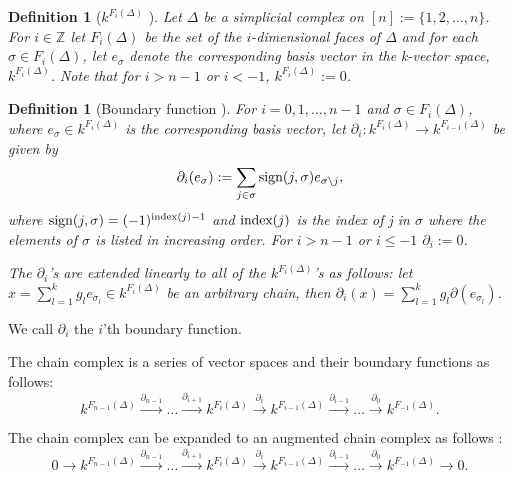 \documentclass[11pt,a4paper,twoside]{report}
\newtheorem{mydef}[mythm]{Definition}
\begin{document}
\begin{mydef}[$k^{F_i(\Delta)}$ \cite{Allgaier}]
Let $\Delta$ be a simplicial complex on $[n] := \{1,2,\dots ,n\}$. For $i\in \mathbb{Z}$ let $F_i(\Delta)$ be the set of the $i$-dimensional faces of $\Delta$ and for each $\sigma\in F_i(\Delta)$, let $e_{\sigma}$ denote the corresponding basis vector in the k-vector space, $k^{F_i(\Delta)}$. Note that for $i>n-1$ or $i<-1$, $k^{F_i(\Delta)}:=0$.
\end{mydef}

\begin{mydef}[Boundary function \cite{Allgaier}]\label{def:boundary}
For $i=0,1,\dots,n-1$ and $\sigma\in F_i(\Delta)$, where $e_\sigma\in k^{F_i(\Delta)}$ is the corresponding basis vector, let $\partial_i: k^{F_i(\Delta)} \to k^{F_{i-1}(\Delta)}$ be given by 
\begin{equation*}
\partial_i(e_\sigma):=\sum_{j\in\sigma}\textnormal{sign}(j,\sigma)e_{\sigma\setminus j} ,
\end{equation*}
where $\textnormal{sign}(j,\sigma) = (-1)^{\textnormal{index}(j)-1}$ and $\textnormal{index}(j)$ is the index of j in $\sigma$ where the elements of $\sigma$ is listed in increasing order. For $i>n-1$ or $i\leq-1$ $\partial_i:=0$. 

The $\partial_i$'s are extended linearly to all of the $k^{F_i(\Delta)}$'s as follows: let $x = \sum_{l=1}^kg_le_{\sigma_l}\in k^{F_i(\Delta)}$ be an arbitrary chain, then $\partial_i(x)=\sum_{l=1}^kg_l\partial (e_{\sigma_l})$.
\end{mydef}
We call $\partial_i$ the $i$'th boundary function.

The chain complex is a series of vector spaces and their boundary functions as follows:
\begin{equation*}
k^{F_{n-1}(\Delta)}\overset{\partial_{n-1}}{\to}\dots\overset{\partial_{i+1}}{\to} k^{F_{i}(\Delta)}\overset{\partial_{i}}{\to}k^{F_{i-1}(\Delta)}\overset{\partial_{i-1}}{\to}\dots\overset{\partial_{0}}{\to} k^{F_{-1}(\Delta)}.
\end{equation*}

The chain complex can be expanded to an augmented chain complex as follows \cite{Allgaier}:
\begin{equation*}
0\to k^{F_{n-1}(\Delta)}\overset{\partial_{n-1}}{\to}\dots\overset{\partial_{i+1}}{\to} k^{F_{i}(\Delta)}\overset{\partial_{i}}{\to}k^{F_{i-1}(\Delta)}\overset{\partial_{i-1}}{\to}\dots\overset{\partial_{0}}{\to} k^{F_{-1}(\Delta)}\to 0.
\end{equation*}
\end{document}
